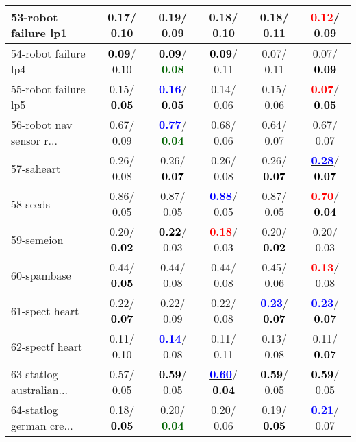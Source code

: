 \begin{table}[h]
\begin{center}
\begin{tabular}{lc|c|c|c|c}
53-robot failure lp1 &   0.17/  0.10 &   0.19/  0.09 &   0.18/  0.10 &   0.18/  0.11 & \textcolor{red}{\textbf{  0.12}}/  0.09 \\ \hline
54-robot failure lp4 & \textcolor{black}{\textbf{  0.09}}/  0.10 & \textcolor{black}{\textbf{  0.09}}/\textcolor{darkgreen}{\textbf{  0.08}} & \textcolor{black}{\textbf{  0.09}}/  0.11 &   0.07/  0.11 &   0.07/\textcolor{black}{\textbf{  0.09}} \\
55-robot failure lp5 &   0.15/\textcolor{black}{\textbf{  0.05}} & \textcolor{blue}{\textbf{  0.16}}/\textcolor{black}{\textbf{  0.05}} &   0.14/  0.06 &   0.15/  0.06 & \textcolor{red}{\textbf{  0.07}}/\textcolor{black}{\textbf{  0.05}} \\
56-robot nav sensor r... &   0.67/  0.09 & \underline{\textcolor{blue}{\textbf{  0.77}}}/\textcolor{darkgreen}{\textbf{  0.04}} &   0.68/  0.06 &   0.64/  0.07 &   0.67/  0.07 \\
57-saheart &   0.26/  0.08 &   0.26/\textcolor{black}{\textbf{  0.07}} &   0.26/  0.08 &   0.26/\textcolor{black}{\textbf{  0.07}} & \underline{\textcolor{blue}{\textbf{  0.28}}}/\textcolor{black}{\textbf{  0.07}} \\
58-seeds &   0.86/  0.05 &   0.87/  0.05 & \textcolor{blue}{\textbf{  0.88}}/  0.05 &   0.87/  0.05 & \textcolor{red}{\textbf{  0.70}}/\textcolor{black}{\textbf{  0.04}} \\
59-semeion &   0.20/\textcolor{black}{\textbf{  0.02}} & \textcolor{black}{\textbf{  0.22}}/  0.03 & \textcolor{red}{\textbf{  0.18}}/  0.03 &   0.20/\textcolor{black}{\textbf{  0.02}} &   0.20/  0.03 \\
60-spambase &   0.44/\textcolor{black}{\textbf{  0.05}} &   0.44/  0.08 &   0.44/  0.08 &   0.45/  0.06 & \textcolor{red}{\textbf{  0.13}}/  0.08 \\ \hline
61-spect heart &   0.22/\textcolor{black}{\textbf{  0.07}} &   0.22/  0.09 &   0.22/  0.08 & \textcolor{blue}{\textbf{  0.23}}/\textcolor{black}{\textbf{  0.07}} & \textcolor{blue}{\textbf{  0.23}}/\textcolor{black}{\textbf{  0.07}} \\
62-spectf heart &   0.11/  0.10 & \textcolor{blue}{\textbf{  0.14}}/  0.08 &   0.11/  0.11 &   0.13/  0.08 &   0.11/\textcolor{black}{\textbf{  0.07}} \\
63-statlog australian... &   0.57/  0.05 & \textcolor{black}{\textbf{  0.59}}/  0.05 & \underline{\textcolor{blue}{\textbf{  0.60}}}/\textcolor{black}{\textbf{  0.04}} & \textcolor{black}{\textbf{  0.59}}/  0.05 & \textcolor{black}{\textbf{  0.59}}/  0.05 \\
64-statlog german cre... &   0.18/\textcolor{black}{\textbf{  0.05}} &   0.20/\textcolor{darkgreen}{\textbf{  0.04}} &   0.20/  0.06 &   0.19/\textcolor{black}{\textbf{  0.05}} & \textcolor{blue}{\textbf{  0.21}}/  0.07 \\\end{tabular}\label{stratsALCKappa1bELMRedux}
\end{center}
\end{table}
